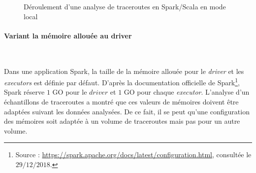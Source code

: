 \begin{figure}[H]
	\centering
	\captionsetup{justification=centering}
	\resizebox{\textwidth}{!}{
		
	}
	\caption{Déroulement d'une analyse de  traceroutes en Spark/Scala en mode local }
	\label{fig:sparktimingLocal}
\end{figure}


\paragraph{Variant la mémoire allouée au driver}~

Dans une application Spark, la taille de la mémoire allouée pour le \textit{driver} et les \textit{executors} est  définie par défaut. D'après la documentation officielle de Spark\footnote{Source : \url{https://spark.apache.org/docs/latest/configuration.html}, consultée le $29/12/2018$.}, Spark réserve $ 1 $ GO pour le $ driver $ et $ 1 $ GO pour chaque \textit{executor}. 
L'analyse d'un échantillons de traceroutes  a montré que ces valeurs de mémoires doivent être adaptées suivant les données analysées. De ce fait, il se peut qu'une configuration des mémoires soit adaptée à un volume de traceroutes mais pas pour un autre volume. 


